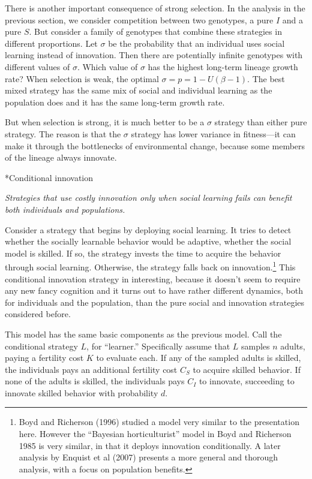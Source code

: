 \documentclass[10pt,reqno]{amsbook}
\makeatletter
\renewcommand\section{\@startsection{section}{1}
\z@{.7\linespacing\@plus\linespacing}{.5\linespacing}
{\large\bfseries\itshape}}
\numberwithin{equation}{chapter}
\newenvironment{precis}
{\noi\itshape}
{\vspace{6pt}}
\newcommand{\noi}{\noindent}
\makeatother
\begin{document}
There is another important consequence of strong selection. In the analysis in the previous section, we consider competition between two genotypes, a pure $I$ and a pure $S$. But consider a family of genotypes that combine these strategies in different proportions. Let $\sigma$ be the probability that an individual uses social learning instead of innovation. Then there are potentially infinite genotypes with different values of $\sigma$. Which value of $\sigma$ has the highest long-term lineage growth rate? When selection is weak, the optimal $\sigma = p = 1 - U(\beta -1)$. 
The best mixed strategy has the same mix of social and individual learning as the population does and it has the same long-term growth rate. 

But when selection is strong, it is much better to be a $\sigma$ strategy than either pure strategy. The reason is that the $\sigma$ strategy has lower variance in fitness---it can make it through the bottlenecks of environmental change, because some members of the lineage always innovate.


\section*{Conditional innovation}

\begin{precis}Strategies that use costly innovation only when social learning fails can benefit both individuals and populations.
\end{precis}

Consider a strategy that begins by deploying social learning. It tries to detect whether the socially learnable behavior would be adaptive, whether the social model is skilled. If so, the strategy invests the time to acquire the behavior through social learning. Otherwise, the strategy falls back on innovation.\footnote{Boyd and Richerson (1996) studied a model very similar to the presentation here. However the ``Bayesian horticulturist'' model in Boyd and Richerson 1985 is very similar, in that it deploys innovation conditionally. A later analysis by Enquist et al (2007) presents a more general and thorough analysis, with a focus on population benefits.} This conditional innovation strategy in interesting, because it doesn't seem to require any new fancy cognition and it turns out to have rather different dynamics, both for individuals and the population, than the pure social and innovation strategies considered before.

This model has the same basic components as the previous model. Call the conditional strategy $L$, for ``learner.'' Specifically assume that $L$ samples $n$ adults, paying a fertility cost $K$ to evaluate each. If any of the sampled adults is skilled, the individuals pays an additional fertility cost $C_S$ to acquire skilled behavior. If none of the adults is skilled, the individuals pays $C_I$ to innovate, succeeding to innovate skilled behavior with probability $d$. 
\end{document}
